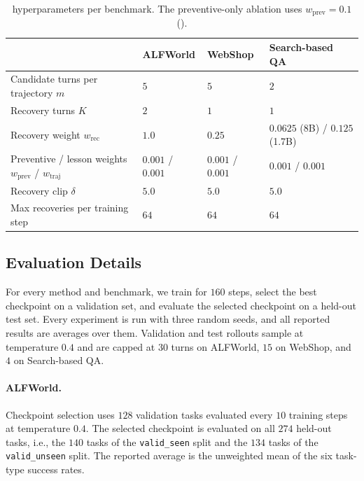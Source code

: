 \begin{table}[h]
\centering
\small
\setlength{\tabcolsep}{6pt}
\renewcommand{\arraystretch}{1.05}
\begin{tabular}{l l l l}
\toprule
 & \textbf{ALFWorld} & \textbf{WebShop} & \textbf{Search-based QA} \\
\midrule
Candidate turns per trajectory $m$    & $5$    & $5$    & $2$ \\
Recovery turns $K$                    & $2$    & $1$    & $1$ \\
Recovery weight $w_\text{rec}$        & $1.0$  & $0.25$ & $0.0625$ (8B) / $0.125$ (1.7B) \\
Preventive / lesson weights $w_\text{prev}$ / $w_\text{traj}$ & $0.001$ / $0.001$ & $0.001$ / $0.001$ & $0.001$ / $0.001$ \\
Recovery clip $\delta$                & $5.0$  & $5.0$  & $5.0$ \\
Max recoveries per training step      & $64$   & $64$   & $64$ \\
\bottomrule
\end{tabular}
\vspace{4pt}
\caption{\method{} hyperparameters per benchmark. The preventive-only ablation uses $w_\text{prev} = 0.1$ ().}
\label{tab:method_hparams}
\end{table}

\subsection{Evaluation Details}
\label{app:eval_details}

For every method and benchmark, we train for $160$ steps, select the best checkpoint on a validation set, and evaluate the selected checkpoint on a held-out test set. Every experiment is run with three random seeds, and all reported results are averages over them. Validation and test rollouts sample at temperature $0.4$ and are capped at $30$ turns on ALFWorld, $15$ on WebShop, and $4$ on Search-based QA.

\paragraph{ALFWorld.} Checkpoint selection uses $128$ validation tasks evaluated every $10$ training steps at temperature $0.4$. The selected checkpoint is evaluated on all $274$ held-out tasks, i.e., the $140$ tasks of the \texttt{valid\_seen} split and the $134$ tasks of the \texttt{valid\_unseen} split. The reported average is the unweighted mean of the six task-type success rates.

